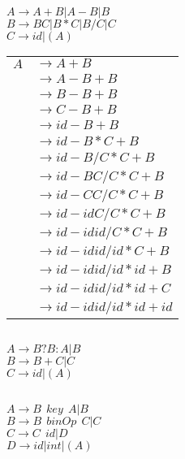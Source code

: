 \subsection{}
$A \longrightarrow A + B | A - B | B$ \\
$B \longrightarrow B C | B * C | B / C | C$ \\
$C \longrightarrow id | (A)$ \\

\begin{tabular}{l l}
$A$ & $\longrightarrow A + B$ \\ 
	& $\longrightarrow A - B + B$ \\
	& $\longrightarrow B - B + B$ \\
	& $\longrightarrow C - B + B$ \\
	& $\longrightarrow id - B + B$ \\
	& $\longrightarrow id - B * C + B$ \\
	& $\longrightarrow id - B / C * C + B$ \\
	& $\longrightarrow id - B C / C * C + B$ \\
	& $\longrightarrow id - C C / C * C + B$ \\
	& $\longrightarrow id - id C / C * C + B$ \\
	& $\longrightarrow id - id id / C * C + B$ \\
	& $\longrightarrow id - id id / id * C + B$ \\
	& $\longrightarrow id - id id / id * id + B$ \\
	& $\longrightarrow id - id id / id * id + C$ \\
	& $\longrightarrow id - id id / id * id + id$ \\
\end{tabular}

\subsection{}
$A \longrightarrow B ? B : A | B$ \\
$B \longrightarrow B + C | C$ \\
$C \longrightarrow id | (A)$ \\

\subsection{}
\subsubsection{}
$A \longrightarrow B \ \ key \ \ A | B$ \\
$B \longrightarrow B \ \ binOp \ \ C | C$ \\
$C \longrightarrow C \ \ id | D$ \\
$D \longrightarrow id | int | (A)$ \\

